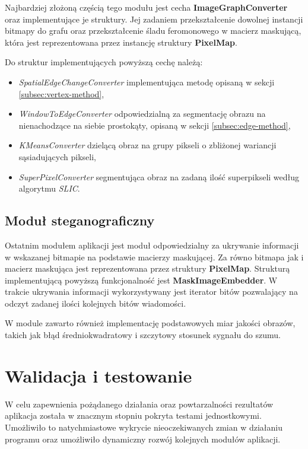 {{{            Najbardziej złożoną częścią tego modułu jest cecha \textbf{ImageGraphConverter} oraz implementujące je
            struktury. Jej zadaniem przekształcenie dowolnej instancji bitmapy do grafu oraz przekształcenie śladu
            feromonowego w macierz maskującą, która jest reprezentowana przez instancję struktury \textbf{PixelMap}.

            Do struktur implementujących powyższą cechę należą:

            \begin{itemize}
                \item \textit{SpatialEdgeChangeConverter} implementująca metodę opisaną w sekcji
                \ref{subsec:vertex-method},
                \item \textit{WindowToEdgeConverter} odpowiedzialną za segmentację obrazu na nienachodzące na siebie
                prostokąty, opisaną w sekcji \ref{subsec:edge-method},
                \item \textit{KMeansConverter} dzielącą obraz na grupy pikseli o zbliżonej wariancji sąsiadujących pikseli,
                \item \textit{SuperPixelConverter} segmentująca obraz na zadaną ilość superpikseli według algorytmu
                \textit{SLIC}.
            \end{itemize}
        }

        \subsection{Moduł steganograficzny}
        {
            Ostatnim modułem aplikacji jest moduł odpowiedzialny za ukrywanie informacji w wskazanej bitmapie na
            podstawie macierzy maskującej. Za równo bitmapa jak i macierz maskująca jest reprezentowana przez struktury
            \textbf{PixelMap}. Strukturą implementującą powyższą funkcjonalność jest \textbf{MaskImageEmbedder}. W
            trakcie ukrywania informacji wykorzystywany jest iterator bitów pozwalający na odczyt zadanej ilości
            kolejnych bitów wiadomości.

            W module zawarto również implementację podstawowych miar jakości obrazów, takich jak błąd średniokwadratowy
            i szczytowy stosunek sygnału do szumu.
        }
    }



    \section{Walidacja i testowanie}
    {
        W celu zapewnienia pożądanego działania oraz powtarzalności rezultatów aplikacja została w znacznym stopniu
        pokryta testami jednostkowymi. Umożliwiło to natychmiastowe wykrycie nieoczekiwanych zmian w działaniu programu
        oraz umożliwiło dynamiczny rozwój kolejnych modułów aplikacji.

}}
